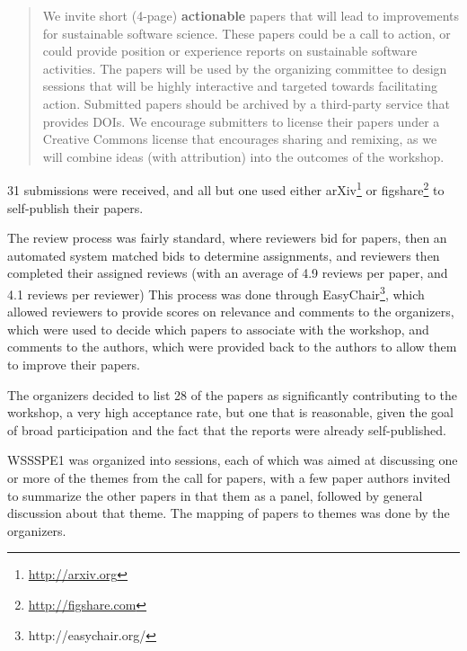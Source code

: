 \documentclass[11pt, oneside]{amsart}
\begin{document}
\begin{quote}
We invite short (4-page) \textbf{actionable} papers that will lead to improvements for sustainable software science. These papers could be a call to action, or could provide position or experience reports on sustainable software activities. The papers will be used by the organizing committee to design sessions that will be highly interactive and targeted towards facilitating action. Submitted papers should be archived by a third-party service that provides DOIs. We encourage submitters to license their papers under a Creative Commons license that encourages sharing and remixing, as we will combine ideas (with attribution) into the outcomes of the workshop.\end{quote}

31 submissions were received, and all but one used either arXiv\footnote{\url{http://arxiv.org}} or figshare\footnote{\url{http://figshare.com}} to self-publish their papers.  

The review process was fairly standard, where reviewers bid for papers, then an automated system
matched bids to determine assignments, and reviewers then completed their assigned
reviews (with an average of 4.9 reviews per paper, and 4.1 reviews per reviewer)
This process was done through EasyChair\footnote{http://easychair.org/}, which allowed reviewers to provide scores on relevance and comments to the organizers, which were used to decide which papers to associate with the workshop, and comments to the authors, which were provided back to the authors to allow them to improve their papers.

The organizers decided to list 28 of the papers as significantly contributing to the workshop, a very high acceptance rate, but one that is reasonable, given the goal of broad participation and the fact that the reports were already self-published.

WSSSPE1 was organized into sessions, each of which was aimed at discussing one or more of the themes from the call for papers, with a few paper authors invited to summarize the other papers in that them as a panel, followed by general discussion about that theme.  The mapping of papers to themes was done by the organizers.
\end{document}

